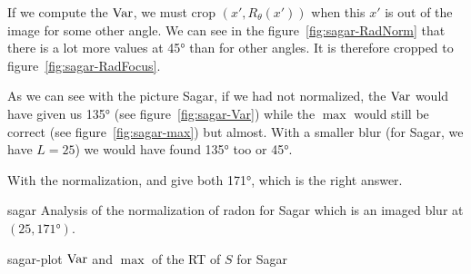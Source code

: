 If we compute the $\operatorname{Var}$, we must crop $(x',R_\theta(x'))$ when
this $x'$ is out of the image for some other angle.
We can see in the figure~\ref{fig:sagar-RadNorm} that
there is a lot more values at \ang{45} than for other angles.
It is therefore cropped to figure~\ref{fig:sagar-RadFocus}.

As we can see with the picture Sagar, if we had not normalized,
the $\operatorname{Var}$ would have given us \ang{135}
(see figure~\ref{fig:sagar-Var}) while the $\max$
would still be correct
(see figure~\ref{fig:sagar-max}) but almost.
With a smaller blur (for Sagar, we have $L = 25$) we would
have found \ang{135} too or \ang{45}.

With the normalization,  and
 give both \ang{171}, which is the right
answer.

\begin{myfig}{sagar}
  {Analysis of the normalization of radon for Sagar which is an imaged blur at
  $(25,\ang{171})$.}
\end{myfig}
\begin{myfig}{sagar-plot}
  {$\operatorname{Var}$ and $\max$ of the RT of $S$ for Sagar}
\end{myfig}

